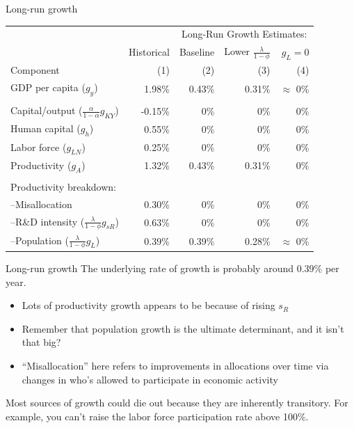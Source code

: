 \begin{frame}{Long-run growth}
\begin{scriptsize}
\begin{tabular}{lrrrr}
\midrule
            &               & \multicolumn{3}{c}{Long-Run Growth Estimates:} \\ \cmidrule(lr){3-5}
            & Historical    & Baseline   & Lower $\frac{\lambda}{1-\phi}$ & $g_L = 0$ \\
Component   &  (1)          &   (2)      &   (3)    & (4) \\
\midrule
GDP per capita ($g_y$) & \phantom{-}1.98\%  &   0.43\%   &  0.31\%   &  $\approx$ 0\%  \\ \\
Capital/output ($\frac{\alpha}{1-\alpha} g_{KY}$) & -0.15\% & 0\%  &  0\% &  0\% \\
Human capital ($g_{h}$) & \phantom{-}0.55\%   &  0\%  &  0\% & 0\% \\
Labor force ($g_{LN}$) & \phantom{-}0.25\%   & 0\%   &  0\%  & 0\% \\
Productivity ($g_{A}$) & \phantom{-}1.32\%   &  0.43\% & 0.31\%   & 0\% \\ \\
\multicolumn{5}{l}{Productivity breakdown:} \\
--Misallocation &  \phantom{-}0.30\%  &  0\%  &  0\% &  0\% \\
--R\&D intensity ($\frac{\lambda}{1-\phi}g_{sR}$) & \phantom{-}0.63\%  &  0\%  &  0\%  & 0\% \\
--Population ($\frac{\lambda}{1-\phi}g_{L}$) & \phantom{-}0.39\%   & 0.39\%  & 0.28\%  & $\approx$ 0\% \\
\midrule
\end{tabular}
\end{scriptsize}
\end{frame}

\begin{frame}{Long-run growth}
The underlying rate of growth is probably around 0.39\% per year. 
\begin{itemize}
	\item Lots of productivity growth appears to be because of rising $s_R$
	\item Remember that population growth is the ultimate determinant, and it isn't that big?
	\item ``Misallocation'' here refers to improvements in allocations over time via changes in who's allowed to participate in economic activity
\end{itemize}
Most sources of growth could die out because they are inherently transitory. For example, you can't raise the labor force participation rate above 100\%. 
\end{frame}

